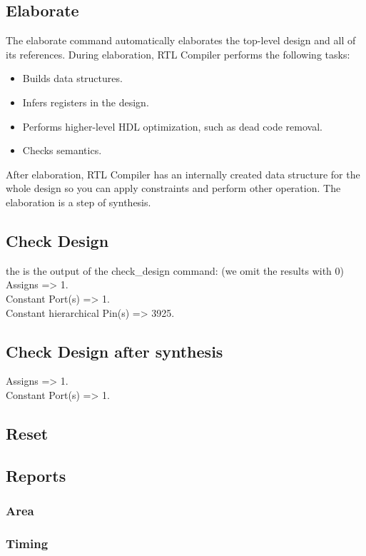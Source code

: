 \documentclass[12pt]{article}
\begin{document}
\subsection*{Elaborate}
The elaborate command automatically elaborates the top-level design and all of its references. During elaboration, RTL Compiler performs the following tasks:
\begin{itemize}
\item Builds data structures.
\item Infers registers in the design.
\item Performs higher-level HDL optimization, such as dead code removal.
\item Checks semantics.
\end{itemize}
After elaboration, RTL Compiler has an internally created data structure for the whole design so you can apply constraints and perform other operation.
The elaboration is a step of synthesis.

\subsection*{Check Design}
the is the output of the check\_design command: (we omit the results with 0)\\
Assigns => 1.\\
Constant Port(s) => 1.\\
Constant hierarchical Pin(s) => 3925.\\

\subsection*{Check Design after synthesis}
Assigns => 1.\\
Constant Port(s) => 1.\\

\subsection*{Reset}
\subsection*{Reports}
\subsubsection*{Area}
\subsubsection*{Timing}
\end{document}
